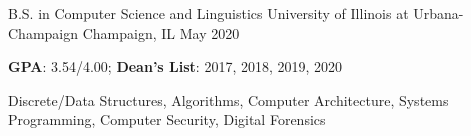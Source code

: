 

\begin{cventries}

  \cventry
    {B.S. in Computer Science and Linguistics} %
    {University of Illinois at Urbana-Champaign} %
    {Champaign, IL} %
    {May 2020} %
    {
      \begin{cvitems} %
        \item {\textbf{GPA}: 3.54/4.00; \textbf{Dean's List}: 2017, 2018, 2019, 2020}
        \item {Discrete/Data Structures, Algorithms, Computer Architecture, Systems Programming, Computer Security, Digital Forensics}%
      \end{cvitems}
    }

\end{cventries}
